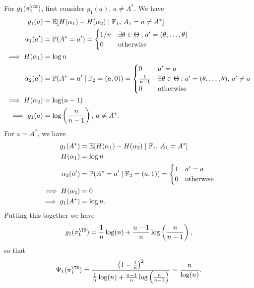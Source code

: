 \documentclass[11pt, openany]{book}
\begin{document}
\begin{example}
\begin{itemize}
\begin{itemize}
                        For $g_1(\pi_1^{\TS})$, first consider $g_1(a)$, $a\neq A^*$. We have
                        \begin{align*}
                            g_1(a) & = \mathbb{E}[H(\alpha_1) - H(\alpha_2) \mid \mathbb{F}_1,\, A_1=a\neq A^*] \\
                            \alpha_1(a') & =  \mathbb{P}(A^*=a') = \begin{cases}
                                1/n & \exists \theta\in\Theta : a' = (\theta,\dots,\theta) \\
                                0 & \text{otherwise}
                            \end{cases} \\
                                \implies H(\alpha_1) & = \log n \\
                                \alpha_2(a') & = \mathbb{P}(A^* =a' \mid \mathbb{F}_2=(a,0)) = \begin{cases}
                                    0 & a' = a \\
                                    \frac{1}{n-1} & \exists\theta\in\Theta : a' = (\theta,\dots,\theta), \, a'\neq a \\
                                    0 & \text{otherwise}
                                \end{cases} \\
                                    \implies H(\alpha_2) & = \log(n-1) \\
                                    \implies g_1(a) & = \log\left(\frac{n}{n-1}\right), \, a\neq A^*.
                        \end{align*}
                        For $a=A^*$, we have
                        \begin{align*}
                            g_1(A^*) & = \mathbb{E}[H(\alpha_1) - H(\alpha_2) \mid \mathbb{F}_1,\,A_1=A^*] \\
                            H(\alpha_1) & = \log n \\
                            \alpha_2(a') & = \mathbb{P}(A^* = a' \mid \mathbb{F}_2=(a,1)) = \begin{cases}
                                1 & a'=a \\
                                0 & \text{otherwise}
                            \end{cases} \\
                                \implies H(\alpha_2) & = 0 \\
                                \implies g_1(A^*) & = \log n.
                        \end{align*}
                        Putting this together we have
                        \[
                            g_1(\pi_1^{\TS}) = \frac{1}{n}\log(n) + \frac{n-1}{n} \log\left(\frac{n}{n-1}\right),
                        \]
                        so that
                        \[
                            \Psi_1(\pi_1^{\TS}) = \frac{ \left(1-\frac{1}{n}\right)^2 }{\frac{1}{n}\log(n) + \frac{n-1}{n}\log\left(\frac{n}{n-1}\right) } \sim \frac{n}{\log(n)}.
                        \]


\end{itemize}
\end{itemize}
\end{example}
\end{document}
